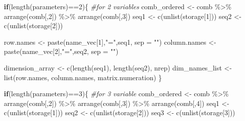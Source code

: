 \documentclass[11pt,a4paper]{article}
\newenvironment{Shaded}{\begin{snugshade}}{\end{snugshade}}
\newcommand{\AttributeTok}[1]{\textcolor[rgb]{0.77,0.63,0.00}{#1}}
\newcommand{\CommentTok}[1]{\textcolor[rgb]{0.56,0.35,0.01}{\textit{#1}}}
\newcommand{\ControlFlowTok}[1]{\textcolor[rgb]{0.13,0.29,0.53}{\textbf{#1}}}
\newcommand{\DecValTok}[1]{\textcolor[rgb]{0.00,0.00,0.81}{#1}}
\newcommand{\FunctionTok}[1]{\textcolor[rgb]{0.00,0.00,0.00}{#1}}
\newcommand{\NormalTok}[1]{#1}
\newcommand{\OtherTok}[1]{\textcolor[rgb]{0.56,0.35,0.01}{#1}}
\newcommand{\SpecialCharTok}[1]{\textcolor[rgb]{0.00,0.00,0.00}{#1}}
\newcommand{\StringTok}[1]{\textcolor[rgb]{0.31,0.60,0.02}{#1}}
\begin{document}
\begin{Shaded}
\begin{Highlighting}[]
  \ControlFlowTok{if}\NormalTok{(}\FunctionTok{length}\NormalTok{(parameters)}\SpecialCharTok{==}\DecValTok{2}\NormalTok{)\{ }\CommentTok{\#for 2 variables}
\NormalTok{    comb\_ordered }\OtherTok{\textless{}{-}}\NormalTok{  comb }\SpecialCharTok{\%\textgreater{}\%} \FunctionTok{arrange}\NormalTok{(comb[,}\DecValTok{2}\NormalTok{])  }\SpecialCharTok{\%\textgreater{}\%} \FunctionTok{arrange}\NormalTok{(comb[,}\DecValTok{3}\NormalTok{])}
\NormalTok{    seq1 }\OtherTok{\textless{}{-}} \FunctionTok{c}\NormalTok{(}\FunctionTok{unlist}\NormalTok{(storage[}\DecValTok{1}\NormalTok{]))}
\NormalTok{    seq2 }\OtherTok{\textless{}{-}} \FunctionTok{c}\NormalTok{(}\FunctionTok{unlist}\NormalTok{(storage[}\DecValTok{2}\NormalTok{]))}
    
\NormalTok{    row.names }\OtherTok{\textless{}{-}} \FunctionTok{paste}\NormalTok{(name\_vec[}\DecValTok{1}\NormalTok{],}\StringTok{"="}\NormalTok{,seq1, }\AttributeTok{sep =} \StringTok{""}\NormalTok{)}
\NormalTok{    column.names }\OtherTok{\textless{}{-}}  \FunctionTok{paste}\NormalTok{(name\_vec[}\DecValTok{2}\NormalTok{],}\StringTok{"="}\NormalTok{,seq2, }\AttributeTok{sep =} \StringTok{""}\NormalTok{)}
    
\NormalTok{    dimension\_array }\OtherTok{\textless{}{-}} \FunctionTok{c}\NormalTok{(}\FunctionTok{length}\NormalTok{(seq1), }\FunctionTok{length}\NormalTok{(seq2), nrep)}
\NormalTok{    dim\_names\_list }\OtherTok{\textless{}{-}} \FunctionTok{list}\NormalTok{(row.names, column.names, matrix.numeration)}
\NormalTok{  \}}
  
  \ControlFlowTok{if}\NormalTok{(}\FunctionTok{length}\NormalTok{(parameters)}\SpecialCharTok{==}\DecValTok{3}\NormalTok{)\{ }\CommentTok{\#for 3 variable}
\NormalTok{    comb\_ordered }\OtherTok{\textless{}{-}}\NormalTok{  comb }\SpecialCharTok{\%\textgreater{}\%} \FunctionTok{arrange}\NormalTok{(comb[,}\DecValTok{2}\NormalTok{])  }\SpecialCharTok{\%\textgreater{}\%} 
      \FunctionTok{arrange}\NormalTok{(comb[,}\DecValTok{3}\NormalTok{]) }\SpecialCharTok{\%\textgreater{}\%} \FunctionTok{arrange}\NormalTok{(comb[,}\DecValTok{4}\NormalTok{]) }
\NormalTok{    seq1 }\OtherTok{\textless{}{-}} \FunctionTok{c}\NormalTok{(}\FunctionTok{unlist}\NormalTok{(storage[}\DecValTok{1}\NormalTok{]))}
\NormalTok{    seq2 }\OtherTok{\textless{}{-}} \FunctionTok{c}\NormalTok{(}\FunctionTok{unlist}\NormalTok{(storage[}\DecValTok{2}\NormalTok{]))}
\NormalTok{    seq3 }\OtherTok{\textless{}{-}} \FunctionTok{c}\NormalTok{(}\FunctionTok{unlist}\NormalTok{(storage[}\DecValTok{3}\NormalTok{]))}
    

\end{Highlighting}
\end{Shaded}
\end{document}
